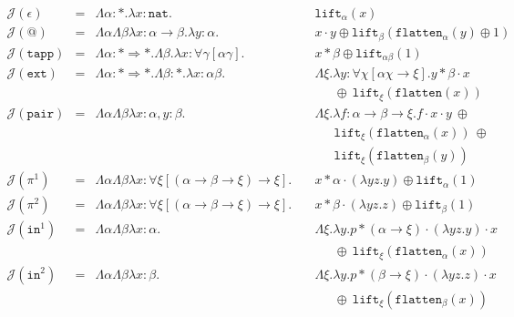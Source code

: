 \documentclass[runningheads,a4paper]{llncs}
\newcommand{\Termmap}{\mathcal{J}}
\newcommand{\quant}[2]{\forall #1[#2]}
\newcommand{\arrtype}{\rightarrow}
\newcommand{\arrkind}{\Rightarrow}
\newcommand{\abs}[2]{\lambda #1.#2}
\newcommand{\tabs}[2]{\Lambda #1.#2}
\newcommand{\nat}{\mathtt{nat}}
\newcommand{\flatten}{\mathtt{flatten}}
\newcommand{\lift}{\mathtt{lift}}
\begin{document}
\[
\begin{array}{rcll}
\Termmap(\epsilon) & = & \Lambda \alpha:* . \lambda x:\nat. &
  \mathtt{lift}_\alpha(x) \\
\Termmap(@) & = & \Lambda\alpha\Lambda\beta\lambda x: \alpha \arrtype \beta . \lambda y :
  \alpha . \quad & x \cdot y \oplus \lift_\beta(\flatten_\alpha(
  y) \oplus 1) \\
\Termmap(\mathtt{tapp}) & = & \Lambda \alpha : * \arrkind * . \Lambda \beta . \lambda x : \quant{\gamma}{\alpha\gamma} . \quad & x * \beta \oplus \lift_{\alpha\beta}(1) \\
\Termmap(\mathtt{ext}) & = & \Lambda \alpha : * \arrkind * . \Lambda \beta : * . \lambda x:\alpha\beta . &
  \tabs{\xi}{\abs{y:\quant{\chi}{\alpha\chi
  \arrtype \xi}}{y * \beta \cdot x}} \\
  & & & \phantom{AB}\oplus\ \lift_\xi(\flatten(x)) \\
\Termmap(\mathtt{pair}) & = & \Lambda \alpha \Lambda \beta \lambda x :
  \alpha, y : \beta.\quad & \Lambda \xi.\abs{f:\alpha \arrtype \beta
  \arrtype \xi}{f \cdot x \cdot y\ \oplus \\
  & & & \phantom{AB}\lift_{\xi}(\flatten_\alpha(x))\ \oplus \\
  & & & \phantom{AB}\lift_\xi(\flatten_\beta(y))} \\
\Termmap(\pi^1) & = & \Lambda \alpha \Lambda \beta \lambda x :
  \quant{\xi}{(\alpha \arrtype \beta \arrtype \xi) \arrtype \xi}.\quad
  & x * \alpha \cdot (\abs{yz}{y}) \oplus \lift_{\alpha}(1) \\
\Termmap(\pi^2) & = & \Lambda \alpha \Lambda \beta \lambda x :
  \quant{\xi}{(\alpha \arrtype \beta \arrtype \xi) \arrtype \xi}.\quad
  & x * \beta \cdot (\abs{yz}{z}) \oplus \lift_{\beta}(1) \\
\Termmap(\mathtt{in}^1) & = & \Lambda \alpha \Lambda \beta \lambda x : \alpha.\quad &
  \Lambda \xi.\lambda y.p * (\alpha \arrtype \xi) \cdot (\abs{yz}{y})
  \cdot x \\
  & & & \phantom{AB}\oplus\ \lift_\xi(\flatten_\alpha(x)) \\
\Termmap(\mathtt{in}^2) & = & \Lambda \alpha \Lambda \beta \lambda x : \beta.\quad &
  \Lambda \xi.\lambda y.p * (\beta \arrtype \xi) \cdot (\abs{yz}{z})
  \cdot x \\
  & & & \phantom{AB}\oplus\ \lift_\xi(\flatten_\beta(x)) \\
\end{array}
\]
\end{document}
